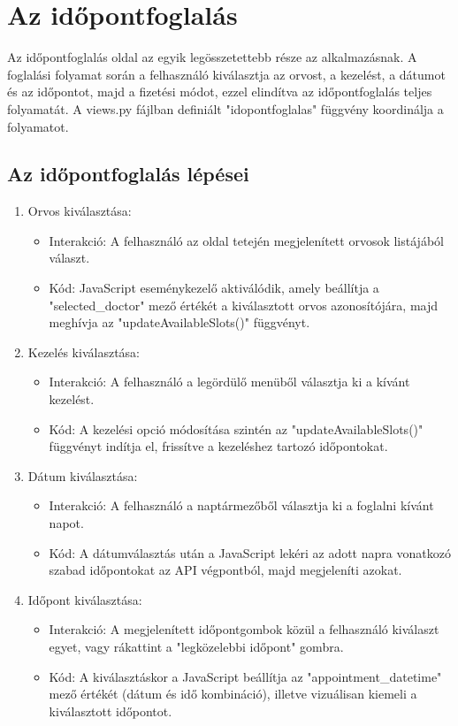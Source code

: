 \section{Az időpontfoglalás}

Az időpontfoglalás oldal az egyik legösszetettebb része az alkalmazásnak. A foglalási folyamat során a felhasználó kiválasztja az orvost, a kezelést, a dátumot és az időpontot, majd a fizetési módot, ezzel elindítva az időpontfoglalás teljes folyamatát. A views.py fájlban definiált "idopontfoglalas" függvény koordinálja a folyamatot.

\subsection{Az időpontfoglalás lépései}
\begin{enumerate}
	\item Orvos kiválasztása:
	\begin{itemize}
		\item Interakció: A felhasználó az oldal tetején megjelenített orvosok listájából választ.
		\item Kód: JavaScript eseménykezelő aktiválódik, amely beállítja a "selected\_doctor" mező értékét a kiválasztott orvos azonosítójára, majd meghívja az "updateAvailableSlots()" függvényt.
	\end{itemize}
	\item Kezelés kiválasztása:
	\begin{itemize}
		\item Interakció: A felhasználó a legördülő menüből választja ki a kívánt kezelést.
		\item Kód: A kezelési opció módosítása szintén az "updateAvailableSlots()" függvényt indítja el, frissítve a kezeléshez tartozó időpontokat.
	\end{itemize}
	\item Dátum kiválasztása:
	\begin{itemize}
		\item Interakció: A felhasználó a naptármezőből választja ki a foglalni kívánt napot.
		\item Kód: A dátumválasztás után a JavaScript lekéri az adott napra vonatkozó szabad időpontokat az API végpontból, majd megjeleníti azokat.
	\end{itemize}
	\item Időpont kiválasztása:
	\begin{itemize}
		\item Interakció: A megjelenített időpontgombok közül a felhasználó kiválaszt egyet, vagy rákattint a "legközelebbi időpont" gombra.
		\item Kód: A kiválasztáskor a JavaScript beállítja az "appointment\_datetime" mező értékét (dátum és idő kombináció), illetve vizuálisan kiemeli a kiválasztott időpontot.
	\end{itemize}
	

\end{enumerate}
